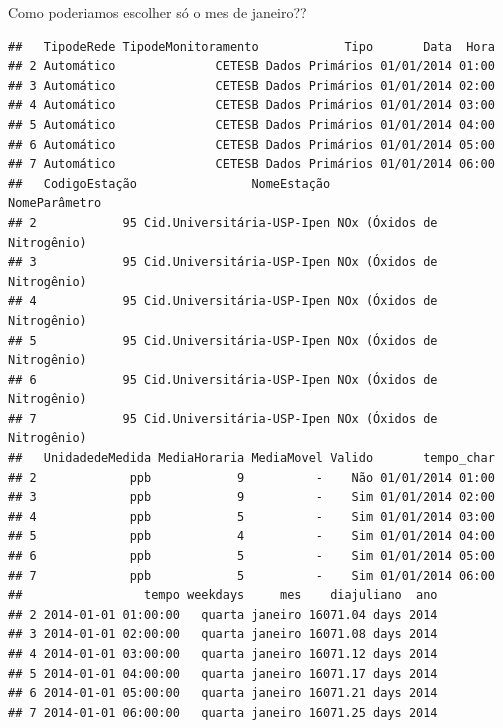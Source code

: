 \documentclass[]{book}
\newenvironment{Shaded}{\begin{snugshade}}{\end{snugshade}}
\newcommand{\KeywordTok}[1]{\textcolor[rgb]{0.13,0.29,0.53}{\textbf{#1}}}
\newcommand{\StringTok}[1]{\textcolor[rgb]{0.31,0.60,0.02}{#1}}
\newcommand{\CommentTok}[1]{\textcolor[rgb]{0.56,0.35,0.01}{\textit{#1}}}
\newcommand{\OperatorTok}[1]{\textcolor[rgb]{0.81,0.36,0.00}{\textbf{#1}}}
\newcommand{\NormalTok}[1]{#1}
\theoremstyle{definition}
\theoremstyle{definition}
\theoremstyle{definition}
\theoremstyle{remark}
\begin{document}
Como poderiamos escolher só o mes de janeiro??

\begin{Shaded}
\end{Shaded}

\begin{verbatim}
##   TipodeRede TipodeMonitoramento            Tipo       Data  Hora
## 2 Automático              CETESB Dados Primários 01/01/2014 01:00
## 3 Automático              CETESB Dados Primários 01/01/2014 02:00
## 4 Automático              CETESB Dados Primários 01/01/2014 03:00
## 5 Automático              CETESB Dados Primários 01/01/2014 04:00
## 6 Automático              CETESB Dados Primários 01/01/2014 05:00
## 7 Automático              CETESB Dados Primários 01/01/2014 06:00
##   CodigoEstação                NomeEstação              NomeParâmetro
## 2            95 Cid.Universitária-USP-Ipen NOx (Óxidos de Nitrogênio)
## 3            95 Cid.Universitária-USP-Ipen NOx (Óxidos de Nitrogênio)
## 4            95 Cid.Universitária-USP-Ipen NOx (Óxidos de Nitrogênio)
## 5            95 Cid.Universitária-USP-Ipen NOx (Óxidos de Nitrogênio)
## 6            95 Cid.Universitária-USP-Ipen NOx (Óxidos de Nitrogênio)
## 7            95 Cid.Universitária-USP-Ipen NOx (Óxidos de Nitrogênio)
##   UnidadedeMedida MediaHoraria MediaMovel Valido       tempo_char
## 2             ppb            9          -    Não 01/01/2014 01:00
## 3             ppb            9          -    Sim 01/01/2014 02:00
## 4             ppb            5          -    Sim 01/01/2014 03:00
## 5             ppb            4          -    Sim 01/01/2014 04:00
## 6             ppb            5          -    Sim 01/01/2014 05:00
## 7             ppb            5          -    Sim 01/01/2014 06:00
##                 tempo weekdays     mes    diajuliano  ano
## 2 2014-01-01 01:00:00   quarta janeiro 16071.04 days 2014
## 3 2014-01-01 02:00:00   quarta janeiro 16071.08 days 2014
## 4 2014-01-01 03:00:00   quarta janeiro 16071.12 days 2014
## 5 2014-01-01 04:00:00   quarta janeiro 16071.17 days 2014
## 6 2014-01-01 05:00:00   quarta janeiro 16071.21 days 2014
## 7 2014-01-01 06:00:00   quarta janeiro 16071.25 days 2014
\end{verbatim}
\end{document}
